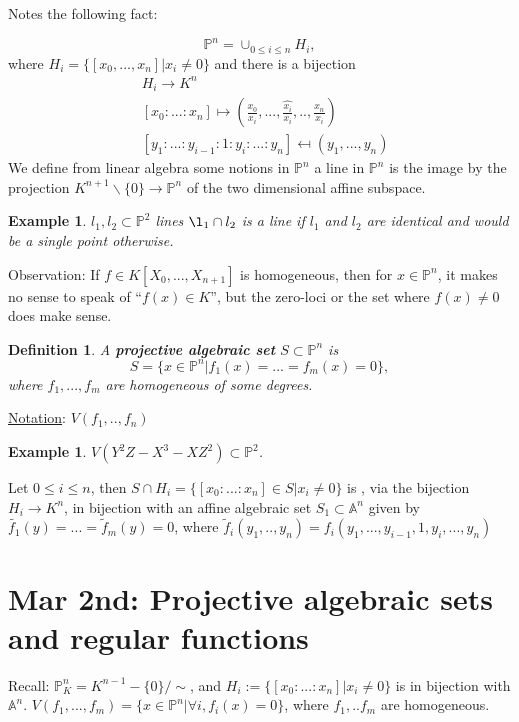 \documentclass[11pt]{article}
\newtheorem{dfn}[thm]{Definition}
\newtheorem{ex}[thm]{Example}
\newcommand{\affn}{\mathbb A}
\newcommand{\proj}{\mathbb P}
\newcommand{\lrta}{\longrightarrow}
\begin{document}
	
	Notes the following fact:
	
	$$
	\proj^n=\cup_{0\leq i\leq n} H_i,
	$$
	where $H_i=\{[x_0,...,x_n]|x_i\neq 0\}$ and there is a bijection 
	$$
	\begin{aligned}
	&H_i\lrta K^n\\
	&[x_0:...:x_n]\longmapsto\left(\frac{x_0}{x_i},...,\widehat{\frac{x_i}{x_i}},..,\frac{x_n}{x_i}\right)\\
	&
	[y_1:...:y_{i-1}:1:y_{i}:...:y_n]\mapsfrom(y_1,...,y_n)
	\end{aligned}
	$$
	We define from linear algebra some notions in $\proj^n$ a line in $\proj^n$ is the image by the projection $K^{n+1}\backslash \{0\}\lrta \proj^n$ of the two dimensional affine subspace.
	
	\begin{ex}
		$l_1,l_2\subset \proj^2$ lines $\l_1\cap l_2$ is a line if $l_1$ and $l_2$ are identical and would be a single point otherwise.
	\end{ex}
	
	Observation: If $f\in K[X_0,...,X_{n+1}]$ is homogeneous, then for $x\in \proj^n$, it makes no sense to speak of ``$f(x)\in K$'', but the zero-loci or the set where $f(x)\neq 0$ does make sense.
	
	\begin{dfn}
		A  \textbf{projective algebraic set} $S\subset \proj^n$ is 
		$$
		S=\{ x\in \proj^n|f_1(x)=...=f_m(x)=0\},
		$$
		where $f_1,...,f_m$ are homogeneous of some degrees.
	\end{dfn}
	
	\underline{Notation}: $V(f_1,..,f_n)$
	
	\begin{ex}
		$V(Y^2 Z-X^3-X Z^2)\subset \proj^2$. 
	\end{ex}
	Let $0\leq i\leq n$, then $S\cap H_i=\{[x_0:...:x_n]\in S| x_i\neq 0\}$ is , via the bijection  $H_i\lrta K^n$, in bijection with an affine algebraic set $S_1\subset \affn^n$ given by $\tilde{f_1}(y)=...=\tilde{f}_m(y)=0$, where $\tilde{f}_i(y_1,..,y_n)=f_i(y_1,...,y_{i-1},1, y_i,...,y_n)$
	
	
	\section{Mar 2nd: Projective algebraic sets and regular functions}
	Recall: $\proj^n_K=K^{n-1}-\{0\}/\sim$, and $H_i:=\{[x_0:...:x_n]|x_i\neq 0\}$ is in bijection with $\affn^n$. $V(f_1,...,f_m)=\{x\in \proj^n|\forall i,f_i(x)=0\}$, where $f_1,..f_m$ are homogeneous.
	
\end{document}
